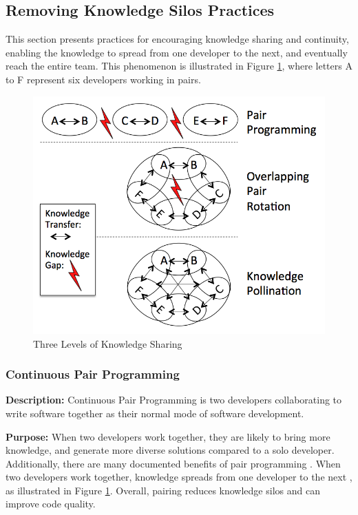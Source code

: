 \subsection{Removing Knowledge Silos Practices}
This section presents practices for encouraging knowledge sharing and continuity, enabling the knowledge to spread from one developer to the next, and eventually reach the entire team. This phenomenon is illustrated in Figure \ref{KnowledgeSharing}, where letters A to F represent six developers working in pairs.

\begin{figure}[t]
\centering
\includegraphics[width=\oneColumnWidth{}]{sustainable_software_development_images/KnowledgeSharingLevels.png}
\caption{Three Levels of Knowledge Sharing}
\label{KnowledgeSharing}
\end{figure}

\subsubsection{Continuous Pair Programming}
\textbf{Description:} Continuous Pair Programming is two developers collaborating to write software together as their normal mode of software development.

\textbf{Purpose:} When two developers work together, they are likely to bring more knowledge, and generate more diverse solutions compared to a solo developer. Additionally, there are many documented benefits of pair programming \cite {Williams2002}. When two developers work together, knowledge spreads from one developer to the next \cite{Zieris2016KnowledgeTransfer}, as illustrated in Figure \ref{KnowledgeSharing}. Overall, pairing reduces knowledge silos and can improve code quality.

